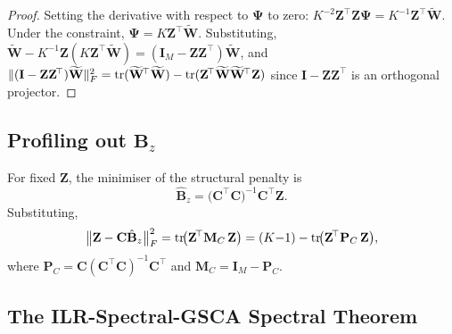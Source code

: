 \begin{proof}
Setting the derivative with respect to $\boldsymbol{\Psi}$ to zero:
$K^{-2}\mathbf{Z}^{\!\top}\mathbf{Z}\boldsymbol{\Psi}
 = K^{-1}\mathbf{Z}^{\!\top}\widetilde{\mathbf{W}}$.
Under the constraint, $\boldsymbol{\Psi}=K\mathbf{Z}^{\!\top}
\widetilde{\mathbf{W}}$. Substituting,
$\widetilde{\mathbf{W}} - K^{-1}\mathbf{Z}(K\mathbf{Z}^{\!\top}
\widetilde{\mathbf{W}})
= (\mathbf{I}_M - \mathbf{Z}\mathbf{Z}^{\!\top})\widetilde{\mathbf{W}}$,
and
$\|(\mathbf{I}-\mathbf{Z}\mathbf{Z}^{\!\top})\widetilde{\mathbf{W}}\|_F^2
= \operatorname{tr}(\widetilde{\mathbf{W}}^{\!\top}\widetilde{\mathbf{W}})
  - \operatorname{tr}(\mathbf{Z}^{\!\top}\widetilde{\mathbf{W}}
    \widetilde{\mathbf{W}}^{\!\top}\mathbf{Z})$
since $\mathbf{I}-\mathbf{Z}\mathbf{Z}^{\!\top}$ is an orthogonal
projector.
\end{proof}

\subsection{Profiling out
\texorpdfstring{$\mathbf{B}_z$}{Bz}}
\label{subsec:profile_Bz}

\begin{proposition}
\label{prop:Bz_profile}
For fixed $\mathbf{Z}$, the minimiser of the structural penalty is
\begin{equation}
  \hat{\mathbf{B}}_z
  = \bigl(\mathbf{C}^{\!\top}\mathbf{C}\bigr)^{-1}
    \mathbf{C}^{\!\top}\mathbf{Z}.
  \label{eq:Bz_hat}
\end{equation}
Substituting,
\begin{equation}
  \bigl\|\mathbf{Z}
    - \mathbf{C}\hat{\mathbf{B}}_z\bigr\|_F^2
  = \operatorname{tr}\!\bigl(
      \mathbf{Z}^{\!\top}\mathbf{M}_C\,\mathbf{Z}
    \bigr)
  = (K{-}1) - \operatorname{tr}\!\bigl(
      \mathbf{Z}^{\!\top}\mathbf{P}_C\,\mathbf{Z}
    \bigr),
  \label{eq:structural_profiled}
\end{equation}
where $\mathbf{P}_C = \mathbf{C}(\mathbf{C}^{\!\top}\mathbf{C})^{-1}
\mathbf{C}^{\!\top}$ and
$\mathbf{M}_C = \mathbf{I}_M - \mathbf{P}_C$.
\end{proposition}

\subsection{The ILR-Spectral-GSCA Spectral Theorem}
\label{subsec:spectral}

